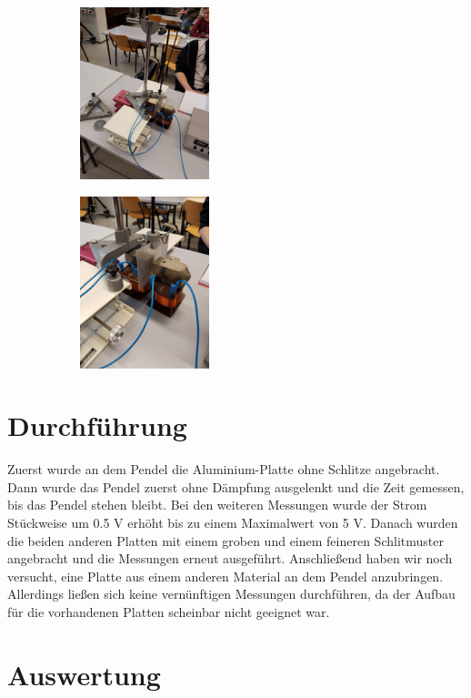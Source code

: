 \begin{figure}
  \centering
  \begin{subfigure}{0.48\textwidth}
    \includegraphics[height=5cm]{20170306_101228.jpg}
  \end{subfigure}
\begin{subfigure}{0.48\textwidth}
    \includegraphics[height=5cm]{20170306_101230.jpg}
  \end{subfigure}
\end{figure}

\section{Durchführung}

Zuerst wurde an dem Pendel die Aluminium-Platte ohne Schlitze angebracht. Dann
wurde das Pendel zuerst ohne Dämpfung ausgelenkt und die Zeit gemessen, bis das
Pendel stehen bleibt. Bei den weiteren Messungen wurde der Strom Stückweise um
0.5 V erhöht bis zu einem Maximalwert von 5 V. Danach wurden die beiden anderen
Platten mit einem groben und einem feineren Schlitmuster angebracht und die Messungen
erneut ausgeführt.
Anschließend haben wir noch versucht, eine Platte aus einem anderen Material an
dem Pendel anzubringen. Allerdings ließen sich keine vernünftigen Messungen
durchführen, da der Aufbau für die vorhandenen Platten scheinbar nicht geeignet
war.



\section{Auswertung}

